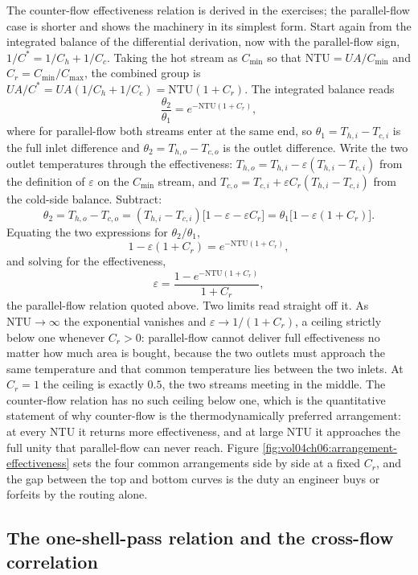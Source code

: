 The counter-flow effectiveness relation is derived in the exercises; the
parallel-flow case is shorter and shows the machinery in its simplest form. Start
again from the integrated balance of the differential derivation, now with the
parallel-flow sign, $1/C^\ast = 1/C_h + 1/C_c$. Taking the hot stream as
$C_{\min}$ so that $\text{NTU} = UA/C_{\min}$ and $C_r = C_{\min}/C_{\max}$, the
combined group is $UA/C^\ast = UA(1/C_h + 1/C_c) = \text{NTU}(1 + C_r)$. The
integrated balance reads
\[
\frac{\theta_2}{\theta_1} = e^{-\text{NTU}(1 + C_r)},
\]
where for parallel-flow both streams enter at the same end, so $\theta_1 = T_{h,i}
- T_{c,i}$ is the full inlet difference and $\theta_2 = T_{h,o} - T_{c,o}$ is the
outlet difference. Write the two outlet temperatures through the effectiveness:
$T_{h,o} = T_{h,i} - \varepsilon(T_{h,i} - T_{c,i})$ from the definition of
$\varepsilon$ on the $C_{\min}$ stream, and $T_{c,o} = T_{c,i} + \varepsilon
C_r(T_{h,i} - T_{c,i})$ from the cold-side balance. Subtract:
\[
\theta_2 = T_{h,o} - T_{c,o}
= (T_{h,i} - T_{c,i})\bigl[1 - \varepsilon - \varepsilon C_r\bigr]
= \theta_1\bigl[1 - \varepsilon(1 + C_r)\bigr].
\]
Equating the two expressions for $\theta_2/\theta_1$,
\[
1 - \varepsilon(1 + C_r) = e^{-\text{NTU}(1 + C_r)},
\]
and solving for the effectiveness,
\[
\varepsilon = \frac{1 - e^{-\text{NTU}(1 + C_r)}}{1 + C_r},
\]
the parallel-flow relation quoted above. Two limits read straight off it. As
$\text{NTU} \to \infty$ the exponential vanishes and $\varepsilon \to 1/(1 + C_r)$,
a ceiling strictly below one whenever $C_r > 0$: parallel-flow cannot deliver full
effectiveness no matter how much area is bought, because the two outlets must
approach the same temperature and that common temperature lies between the two
inlets. At $C_r = 1$ the ceiling is exactly $0.5$, the two streams meeting in the
middle. The counter-flow relation has no such ceiling below one, which is the
quantitative statement of why counter-flow is the thermodynamically preferred
arrangement: at every NTU it returns more effectiveness, and at large NTU it
approaches the full unity that parallel-flow can never reach. Figure
\ref{fig:vol04ch06:arrangement-effectiveness} sets the four common arrangements
side by side at a fixed $C_r$, and the gap between the top and bottom curves is the
duty an engineer buys or forfeits by the routing alone.



\subsection{The one-shell-pass relation and the cross-flow correlation}

